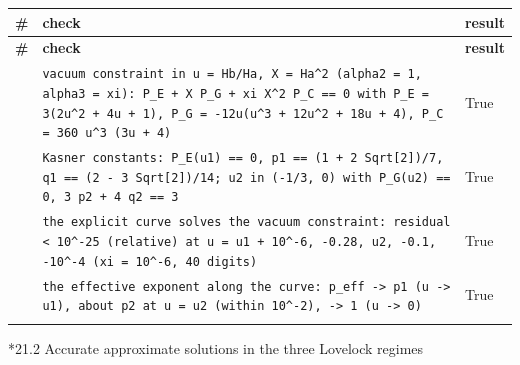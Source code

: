 \documentclass[10pt,a4paper]{article}
\makeatletter
\renewcommand\subsubsection{\@startsection{subsubsection}{3}{\z@}{-3.25ex\@plus -1ex \@minus -.2ex}{1.5ex \@plus .2ex}{\normalfont\normalsize\bfseries\raggedright}}
\makeatother
\begin{document}
{\footnotesize
\begin{longtable}{>{\raggedright\arraybackslash}p{}>{\raggedright\arraybackslash}p{}>{\raggedright\arraybackslash}p{}}
\toprule
\textbf{\#} & \textbf{check} & \textbf{result} \\
\midrule\endfirsthead
\toprule
\textbf{\#} & \textbf{check} & \textbf{result} \\
\midrule\endhead
\endfoot
\bottomrule\endlastfoot
366 & \texttt{vacuum constraint in u = Hb/\allowbreak{}Ha, X = Ha\textasciicircum{}2 (alpha2 = 1, alpha3 = xi): P\_\allowbreak{}E + X P\_\allowbreak{}G + xi X\textasciicircum{}2 P\_\allowbreak{}C == 0 with P\_\allowbreak{}E = 3(2u\textasciicircum{}2 + 4u + 1), P\_\allowbreak{}G = -12u(u\textasciicircum{}3 + 12u\textasciicircum{}2 + 18u + 4), P\_\allowbreak{}C = 360 u\textasciicircum{}3 (3u + 4)} & True \\
367 & \texttt{Kasner constants: P\_\allowbreak{}E(u1) == 0, p1 == (1 + 2 Sqrt[2])/\allowbreak{}7, q1 == (2 - 3 Sqrt[2])/\allowbreak{}14; u2 in (-1/\allowbreak{}3, 0) with P\_\allowbreak{}G(u2) == 0, 3 p2 + 4 q2 == 3} & True \\
368 & \texttt{the explicit curve solves the vacuum constraint: residual < 10\textasciicircum{}-25 (relative) at u = u1 + 10\textasciicircum{}-6, -0.28, u2, -0.1, -10\textasciicircum{}-4 (xi = 10\textasciicircum{}-6, 40 digits)} & True \\
369 & \texttt{the effective exponent along the curve: p\_\allowbreak{}eff -> p1 (u -> u1), about p2 at u = u2 (within 10\textasciicircum{}-2), -> 1 (u -> 0)} & True \\*
\end{longtable}}
\subsubsection*{21.2 Accurate approximate solutions in the three Lovelock regimes}
\end{document}
